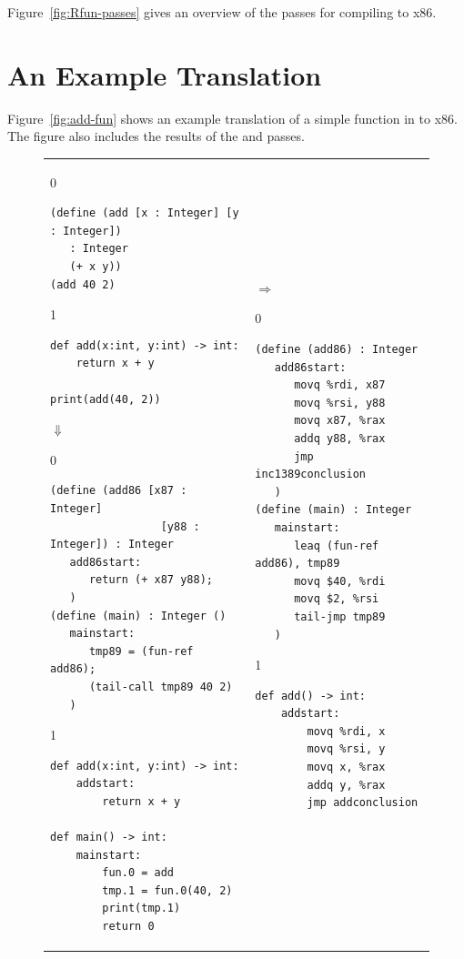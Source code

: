 \documentclass[7x10]{TimesAPriori_MIT}%
\def\racketEd{0}
\def\pythonEd{1}
\def\edition{1}
\begin{document}
Figure~\ref{fig:Rfun-passes} gives an overview of the passes for
compiling \LangFun{} to x86.

\section{An Example Translation}
\label{sec:functions-example}

Figure~\ref{fig:add-fun} shows an example translation of a simple
function in \LangFun{} to x86. The figure also includes the results of the
 and  passes.

\begin{figure}[htbp]
\begin{tabular}{ll}
\begin{minipage}{0.4\textwidth}
{\if\edition\racketEd
\begin{lstlisting}[basicstyle=\ttfamily\footnotesize]
(define (add [x : Integer] [y : Integer])
   : Integer
   (+ x y))
(add 40 2)
\end{lstlisting}
\fi}
{\if\edition\pythonEd
\begin{lstlisting}[basicstyle=\ttfamily\footnotesize]
def add(x:int, y:int) -> int:
    return x + y

print(add(40, 2))
\end{lstlisting}
\fi}
$\Downarrow$
{\if\edition\racketEd
\begin{lstlisting}[basicstyle=\ttfamily\footnotesize]
(define (add86 [x87 : Integer]
                 [y88 : Integer]) : Integer
   add86start:
      return (+ x87 y88);
   )
(define (main) : Integer ()
   mainstart:
      tmp89 = (fun-ref add86);
      (tail-call tmp89 40 2)
   )
\end{lstlisting}
\fi}
{\if\edition\pythonEd
\begin{lstlisting}[basicstyle=\ttfamily\footnotesize]
def add(x:int, y:int) -> int:
    addstart:
        return x + y

def main() -> int:
    mainstart:
        fun.0 = add
        tmp.1 = fun.0(40, 2)
        print(tmp.1)
        return 0
\end{lstlisting}
\fi}
\end{minipage}
&
$\Rightarrow$
\begin{minipage}{0.5\textwidth}
{\if\edition\racketEd
\begin{lstlisting}[basicstyle=\ttfamily\footnotesize]
(define (add86) : Integer
   add86start:
      movq %rdi, x87
      movq %rsi, y88
      movq x87, %rax
      addq y88, %rax
      jmp inc1389conclusion
   )
(define (main) : Integer
   mainstart:
      leaq (fun-ref add86), tmp89
      movq $40, %rdi
      movq $2, %rsi
      tail-jmp tmp89
   )
\end{lstlisting}
\fi}
{\if\edition\pythonEd
\begin{lstlisting}[basicstyle=\ttfamily\footnotesize]
def add() -> int:
    addstart:
        movq %rdi, x
        movq %rsi, y
        movq x, %rax
        addq y, %rax
        jmp addconclusion


\end{lstlisting}}
\end{minipage}
\end{tabular}
\end{figure}
\end{document}

